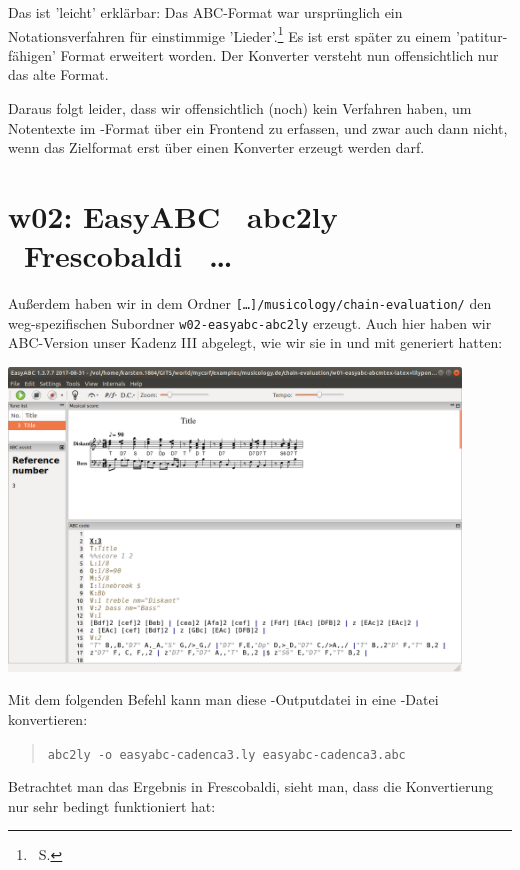 Das ist 'leicht' erklärbar: Das ABC-Format war ursprünglich ein
Notationsverfahren für einstimmige 'Lieder'.\footnote{\ra\ S. \pageref{ABCMethod}}
Es ist erst später zu einem 'patitur-fähigen' Format erweitert worden. Der
Konverter  versteht nun offensichtlich nur das alte Format.
 
Daraus folgt leider, dass wir offensichtlich (noch) kein Verfahren haben, um 
Notentexte im -Format über ein Frontend zu erfassen, und zwar auch
dann nicht, wenn das Zielformat erst über einen Konverter erzeugt werden darf.

\section{w02: Easy\-ABC \ra\ abc2ly  \ra\ Frescobaldi \ra\ \ldots}\label{w02}

Außerdem haben wir in dem Ordner \texttt{[\ldots]/musicology/chain-evaluation/}
den weg-spezifischen Subordner \texttt{w02-easyabc-abc2ly} erzeugt. Auch hier
haben wir ABC-Version unser Kadenz III abgelegt, wie wir sie in und mit
 generiert hatten:

\begin{center}
\includegraphics[width=0.9\textwidth]{frontends/easyabc/easyabc-cadenca3.png}
\end{center}

Mit dem folgenden Befehl kann man diese -Outputdatei in eine
-Datei konvertieren:

\begin{quote}\texttt{abc2ly -o easyabc-cadenca3.ly easyabc-cadenca3.abc}\end{quote}

Betrachtet man das Ergebnis in Frescobaldi, sieht man, dass die Konvertierung
nur sehr bedingt funktioniert hat:

